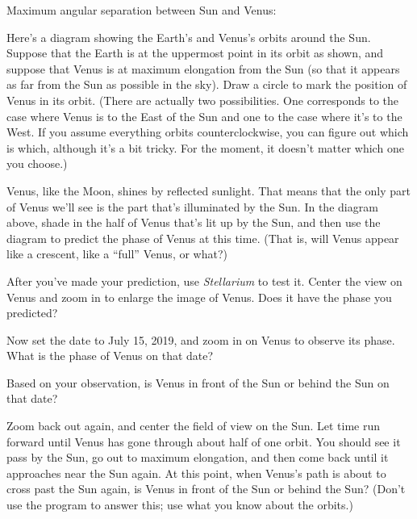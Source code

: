 Maximum angular separation between Sun and Venus:

\vskip 0.7in

Here's a diagram showing the Earth's and Venus's orbits around the
Sun.  Suppose that the Earth is at the uppermost point in its orbit as
shown, and suppose that Venus is at maximum elongation from the Sun
(so that it appears as far from the Sun as possible in the sky).  Draw
a circle to mark the position of Venus in its orbit.  (There are
actually two possibilities.  One corresponds to the case where Venus
is to the East of the Sun and one to the case where it's to the West.
If you assume everything orbits
counterclockwise, you can figure out which is which, although
it's a bit tricky.  For the moment, it doesn't matter which one you choose.)

\begin{figure}[h]
\centerline{\epsfxsize 3in}
\end{figure}


Venus, like the Moon, shines by reflected sunlight.  That means that
the only part of Venus we'll see is the part that's illuminated by the 
Sun.  In the diagram above, shade in the half of Venus that's lit up by
the Sun, and then use the diagram to predict the phase of Venus
at this time.  (That is, will Venus appear like a crescent, like
a ``full'' Venus, or what?)

\vskip 0.7in

After you've made your prediction, use \textit{Stellarium}
to test it.
Center the view on Venus and zoom in to enlarge the image of Venus.
Does it have the phase you predicted?

\vskip 0.7in

Now set the date to July 15, 2019, and 
zoom in on Venus to observe its phase.  What is the phase of Venus on that date?

\vskip 0.7in

Based on your observation, is Venus in front of the Sun or behind the Sun
on that date?

\vskip 0.7in

Zoom back out again, and center the field of view on the Sun.  Let time
run forward until Venus has gone through about half of one orbit.  You
should see it pass by the Sun, go out to maximum elongation, and then come
back until it approaches near the Sun again.  At this point, when
Venus's path is about to cross past the Sun again, is Venus in front
of the Sun or behind the Sun?  (Don't use the program to answer this; 
use what you know about the orbits.)


